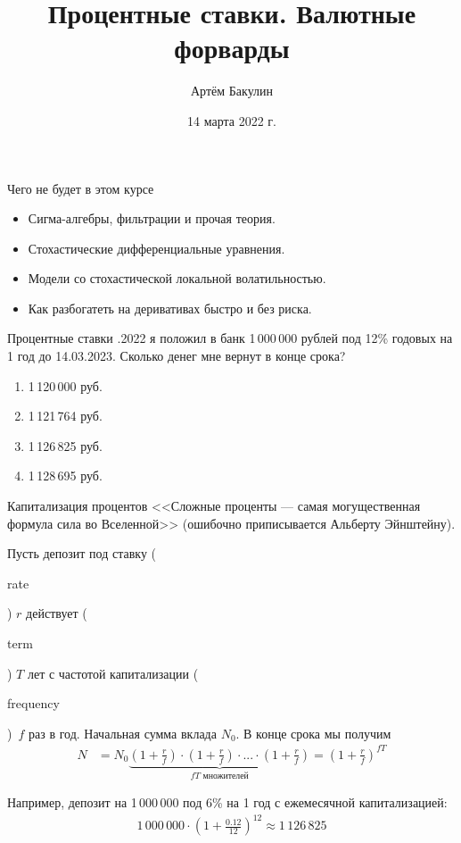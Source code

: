 \documentclass{beamer}
\title{Процентные ставки. Валютные форварды}
\author{Артём Бакулин}
\date{14 марта 2022 г.}
\newcommand{\en}[1]{\begin{otherlanguage}{english}#1\end{otherlanguage}}
\begin{document}
\begin{frame}
\titlepage
\end{frame}



\begin{frame}{Чего не будет в этом курсе}
\begin{itemize}
\justifying
\item Сигма-алгебры, фильтрации и прочая теория.
\item Стохастические дифференциальные уравнения.
\item Модели со стохастической локальной волатильностью.
\item Как разбогатеть на деривативах быстро и без риска.
\end{itemize}
\end{frame}



\begin{frame}{Процентные ставки}
.2022 я положил в банк 1\,000\,000 рублей под 12\% годовых на 1 год до 
14.03.2023. Сколько денег мне вернут в конце срока?

\begin{enumerate}[label=\Alph*]
\item 1\,120\,000 руб. 
\item 1\,121\,764 руб. 
\item 1\,126\,825 руб. 
\item 1\,128\,695 руб. 
\end{enumerate}

\end{frame}


\begin{frame}{Капитализация процентов}
\justify
<<Сложные проценты --- самая могущественная формула сила во Вселенной>> 
(ошибочно приписывается Альберту Эйнштейну).

\justify
Пусть депозит под ставку (\en{rate}) $r$ действует (\en{term}) $T$ лет с 
частотой капитализации (\en{frequency})\ $f$ раз в год. Начальная сумма вклада 
$N_0$. В конце срока мы получим
\begin{align*}
N &= N_0\underbrace{\left(1 + \frac{r}{f}\right) \cdot \left(1 + \frac{r}{f}\right) \cdot ... \cdot \left(1 + \frac{r}{f}\right)}_{fT \text{\ множителей}} = 
 \left(1 + \frac{r}{f}\right)^{fT}
\end{align*}

Например, депозит на 1\,000\,000 под 6\% на 1 год с ежемесячной капитализацией:
\begin{align*}
1\,000\,000 \cdot \left(1 + \frac{0.12}{12}\right)^{12} \approx 1\,126\,825
\end{align*}
\end{frame}
\end{document}
